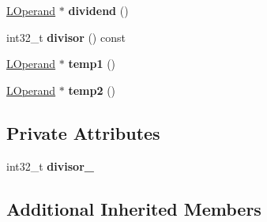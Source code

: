 \begin{DoxyCompactItemize}
\item 
\hyperlink{classv8_1_1internal_1_1_l_operand}{L\+Operand} $\ast$ {\bfseries dividend} ()\hypertarget{classv8_1_1internal_1_1_l_mod_by_const_i_aeb9656f49d65a07307ea1a8d195f37f9}{}\label{classv8_1_1internal_1_1_l_mod_by_const_i_aeb9656f49d65a07307ea1a8d195f37f9}

\item 
int32\+\_\+t {\bfseries divisor} () const \hypertarget{classv8_1_1internal_1_1_l_mod_by_const_i_a3c44698a4d3f5b97d2d382e3d63510e3}{}\label{classv8_1_1internal_1_1_l_mod_by_const_i_a3c44698a4d3f5b97d2d382e3d63510e3}

\item 
\hyperlink{classv8_1_1internal_1_1_l_operand}{L\+Operand} $\ast$ {\bfseries temp1} ()\hypertarget{classv8_1_1internal_1_1_l_mod_by_const_i_aabd5104c1bee0961a7b736ab37c10a79}{}\label{classv8_1_1internal_1_1_l_mod_by_const_i_aabd5104c1bee0961a7b736ab37c10a79}

\item 
\hyperlink{classv8_1_1internal_1_1_l_operand}{L\+Operand} $\ast$ {\bfseries temp2} ()\hypertarget{classv8_1_1internal_1_1_l_mod_by_const_i_a06f95f7010599c83bd9b16e5dfc293d2}{}\label{classv8_1_1internal_1_1_l_mod_by_const_i_a06f95f7010599c83bd9b16e5dfc293d2}

\end{DoxyCompactItemize}
\subsection*{Private Attributes}
\begin{DoxyCompactItemize}
\item 
int32\+\_\+t {\bfseries divisor\+\_\+}\hypertarget{classv8_1_1internal_1_1_l_mod_by_const_i_a34fa58674ab3cb61bcd1e3055ccbdeb8}{}\label{classv8_1_1internal_1_1_l_mod_by_const_i_a34fa58674ab3cb61bcd1e3055ccbdeb8}

\end{DoxyCompactItemize}
\subsection*{Additional Inherited Members}


